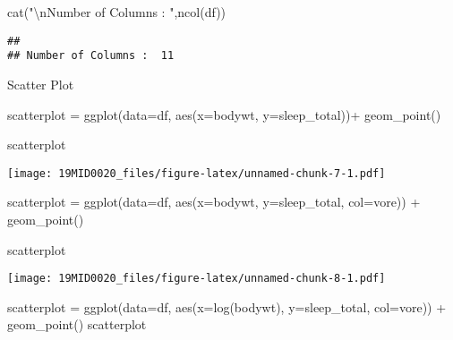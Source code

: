 \documentclass[
]{article}
\newenvironment{Shaded}{\begin{snugshade}}{\end{snugshade}}
\newcommand{\AttributeTok}[1]{\textcolor[rgb]{0.77,0.63,0.00}{#1}}
\newcommand{\FunctionTok}[1]{\textcolor[rgb]{0.00,0.00,0.00}{#1}}
\newcommand{\NormalTok}[1]{#1}
\newcommand{\OtherTok}[1]{\textcolor[rgb]{0.56,0.35,0.01}{#1}}
\newcommand{\SpecialCharTok}[1]{\textcolor[rgb]{0.00,0.00,0.00}{#1}}
\newcommand{\StringTok}[1]{\textcolor[rgb]{0.31,0.60,0.02}{#1}}
\begin{document}
\begin{Shaded}
\begin{Highlighting}[]
\FunctionTok{cat}\NormalTok{(}\StringTok{"}\SpecialCharTok{\textbackslash{}n}\StringTok{Number of Columns : "}\NormalTok{,}\FunctionTok{ncol}\NormalTok{(df))}
\end{Highlighting}
\end{Shaded}

\begin{verbatim}
## 
## Number of Columns :  11
\end{verbatim}

Scatter Plot

\begin{Shaded}
\begin{Highlighting}[]
\NormalTok{scatterplot }\OtherTok{=} \FunctionTok{ggplot}\NormalTok{(}\AttributeTok{data=}\NormalTok{df, }\FunctionTok{aes}\NormalTok{(}\AttributeTok{x=}\NormalTok{bodywt, }\AttributeTok{y=}\NormalTok{sleep\_total))}\SpecialCharTok{+}
              \FunctionTok{geom\_point}\NormalTok{()}

\NormalTok{scatterplot}
\end{Highlighting}
\end{Shaded}

\texttt{[image: 19MID0020\_files/figure-latex/unnamed-chunk-7-1.pdf]}

\begin{Shaded}
\begin{Highlighting}[]
\NormalTok{scatterplot }\OtherTok{=} \FunctionTok{ggplot}\NormalTok{(}\AttributeTok{data=}\NormalTok{df, }\FunctionTok{aes}\NormalTok{(}\AttributeTok{x=}\NormalTok{bodywt, }\AttributeTok{y=}\NormalTok{sleep\_total, }\AttributeTok{col=}\NormalTok{vore)) }\SpecialCharTok{+} 
             \FunctionTok{geom\_point}\NormalTok{()}

\NormalTok{scatterplot}
\end{Highlighting}
\end{Shaded}

\texttt{[image: 19MID0020\_files/figure-latex/unnamed-chunk-8-1.pdf]}

\begin{Shaded}
\begin{Highlighting}[]
\NormalTok{scatterplot }\OtherTok{=} \FunctionTok{ggplot}\NormalTok{(}\AttributeTok{data=}\NormalTok{df, }\FunctionTok{aes}\NormalTok{(}\AttributeTok{x=}\FunctionTok{log}\NormalTok{(bodywt), }\AttributeTok{y=}\NormalTok{sleep\_total, }\AttributeTok{col=}\NormalTok{vore)) }\SpecialCharTok{+} \FunctionTok{geom\_point}\NormalTok{()}
\NormalTok{scatterplot}
\end{Highlighting}
\end{Shaded}
\end{document}
